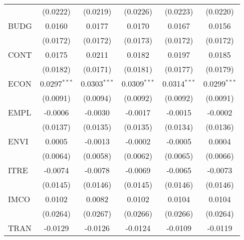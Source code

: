 \begin{tabular}{lccccc}
                                             & (0.0222)       & (0.0219)       & (0.0226)       & (0.0223)       & (0.0220)\\   
   BUDG                                      & 0.0160         & 0.0177         & 0.0170         & 0.0167         & 0.0156\\   
                                             & (0.0172)       & (0.0172)       & (0.0173)       & (0.0172)       & (0.0172)\\   
   CONT                                      & 0.0175         & 0.0211         & 0.0182         & 0.0197         & 0.0185\\   
                                             & (0.0182)       & (0.0171)       & (0.0181)       & (0.0177)       & (0.0179)\\   
   ECON                                      & 0.0297$^{***}$ & 0.0303$^{***}$ & 0.0309$^{***}$ & 0.0314$^{***}$ & 0.0299$^{***}$\\   
                                             & (0.0091)       & (0.0094)       & (0.0092)       & (0.0092)       & (0.0091)\\   
   EMPL                                      & -0.0006        & -0.0030        & -0.0017        & -0.0015        & -0.0002\\   
                                             & (0.0137)       & (0.0135)       & (0.0135)       & (0.0134)       & (0.0136)\\   
   ENVI                                      & 0.0005         & -0.0013        & -0.0002        & -0.0005        & 0.0004\\   
                                             & (0.0064)       & (0.0058)       & (0.0062)       & (0.0065)       & (0.0066)\\   
   ITRE                                      & -0.0074        & -0.0078        & -0.0069        & -0.0065        & -0.0073\\   
                                             & (0.0145)       & (0.0146)       & (0.0145)       & (0.0146)       & (0.0146)\\   
   IMCO                                      & 0.0102         & 0.0082         & 0.0102         & 0.0104         & 0.0104\\   
                                             & (0.0264)       & (0.0267)       & (0.0266)       & (0.0266)       & (0.0264)\\   
   TRAN                                      & -0.0129        & -0.0126        & -0.0124        & -0.0109        & -0.0119\\   

\end{tabular}
